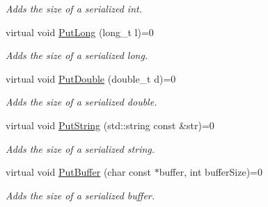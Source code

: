 \begin{DoxyCompactItemize}
\begin{DoxyCompactList}\small\item\em Adds the size of a serialized int. \end{DoxyCompactList}\item 
\hypertarget{class_common_1_1_serializer_a81707bcd851d97120e44738605eb2c61}{virtual void \hyperlink{class_common_1_1_serializer_a81707bcd851d97120e44738605eb2c61}{Put\-Long} (long\-\_\-t l)=0}\label{class_common_1_1_serializer_a81707bcd851d97120e44738605eb2c61}

\begin{DoxyCompactList}\small\item\em Adds the size of a serialized long. \end{DoxyCompactList}\item 
\hypertarget{class_common_1_1_serializer_aae8365d415cefb35dbd5ec871a2c8ea3}{virtual void \hyperlink{class_common_1_1_serializer_aae8365d415cefb35dbd5ec871a2c8ea3}{Put\-Double} (double\-\_\-t d)=0}\label{class_common_1_1_serializer_aae8365d415cefb35dbd5ec871a2c8ea3}

\begin{DoxyCompactList}\small\item\em Adds the size of a serialized double. \end{DoxyCompactList}\item 
\hypertarget{class_common_1_1_serializer_a222ec745d1a6a144e02e196b2b4b273a}{virtual void \hyperlink{class_common_1_1_serializer_a222ec745d1a6a144e02e196b2b4b273a}{Put\-String} (std\-::string const \&str)=0}\label{class_common_1_1_serializer_a222ec745d1a6a144e02e196b2b4b273a}

\begin{DoxyCompactList}\small\item\em Adds the size of a serialized string. \end{DoxyCompactList}\item 
\hypertarget{class_common_1_1_serializer_a53a4cff20c5f3fc5a8c7903aaf31e7ac}{virtual void \hyperlink{class_common_1_1_serializer_a53a4cff20c5f3fc5a8c7903aaf31e7ac}{Put\-Buffer} (char const $\ast$buffer, int buffer\-Size)=0}\label{class_common_1_1_serializer_a53a4cff20c5f3fc5a8c7903aaf31e7ac}

\begin{DoxyCompactList}\small\item\em Adds the size of a serialized buffer. \end{DoxyCompactList}\end{DoxyCompactItemize}


